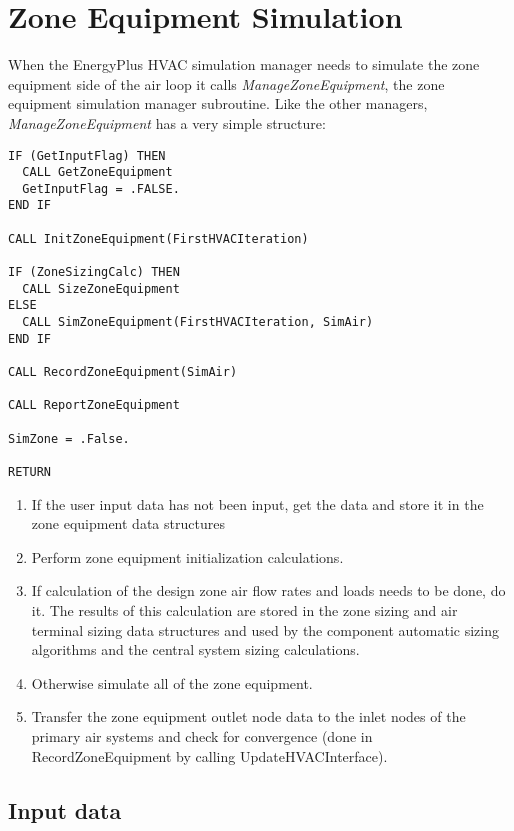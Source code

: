 \section{Zone Equipment Simulation}\label{zone-equipment-simulation}

When the EnergyPlus HVAC simulation manager needs to simulate the zone equipment side of the air loop it calls \emph{ManageZoneEquipment}, the zone equipment simulation manager subroutine. Like the other managers, \emph{ManageZoneEquipment} has a very simple structure:

\begin{lstlisting}
IF (GetInputFlag) THEN
  CALL GetZoneEquipment
  GetInputFlag = .FALSE.
END IF

CALL InitZoneEquipment(FirstHVACIteration)

IF (ZoneSizingCalc) THEN
  CALL SizeZoneEquipment
ELSE
  CALL SimZoneEquipment(FirstHVACIteration, SimAir)
END IF

CALL RecordZoneEquipment(SimAir)
 
CALL ReportZoneEquipment

SimZone = .False.

RETURN
\end{lstlisting}

\begin{enumerate}
\def\labelenumi{\arabic{enumi}.}
\item
  If the user input data has not been input, get the data and store it in the zone equipment data structures
\item
  Perform zone equipment initialization calculations.
\item
  If calculation of the design zone air flow rates and loads needs to be done, do it. The results of this calculation are stored in the zone sizing and air terminal sizing data structures and used by the component automatic sizing algorithms and the central system sizing calculations.
\item
  Otherwise simulate all of the zone equipment.
\item
  Transfer the zone equipment outlet node data to the inlet nodes of the primary air systems and check for convergence (done in RecordZoneEquipment by calling UpdateHVACInterface).
\end{enumerate}

\subsection{Input data}\label{input-data-000}

